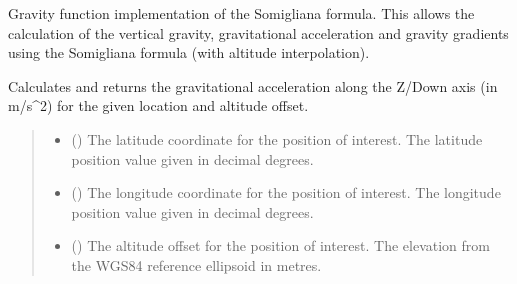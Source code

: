 \documentclass[letterpaper,10pt,english]{sphinxmanual}
\begin{document}
\begin{fulllineitems}
\label{\detokenize{modules/gravity/somigliana:qnav.gravity.somigliana.Somigliana}}
\pysigstartsignatures
{}
\pysigstopsignatures
\sphinxAtStartPar
Gravity function implementation of the Somigliana formula.
This allows the calculation of the vertical gravity, gravitational
acceleration and gravity gradients using the Somigliana formula
(with altitude interpolation).

\begin{fulllineitems}
\label{\detokenize{modules/gravity/somigliana:qnav.gravity.somigliana.Somigliana.calc_gravity_z}}
\pysigstartsignatures
{}
\pysigstopsignatures
\sphinxAtStartPar
Calculates and returns the gravitational acceleration along the Z/Down
axis (in m/s\textasciicircum{}2) for the given location and altitude offset.
\begin{quote}\begin{description}
\begin{itemize}
\item {} 
\sphinxAtStartPar
{} () \textendash{} The latitude coordinate for the position of interest.
The latitude position value given in decimal degrees.

\item {} 
\sphinxAtStartPar
{} () \textendash{} The longitude coordinate for the position of interest.
The longitude position value given in decimal degrees.

\item {} 
\sphinxAtStartPar
{} () \textendash{} The altitude offset for the position of interest.
The elevation from the WGS\sphinxhyphen{}84 reference ellipsoid in metres.


\end{itemize}
\end{description}
\end{quote}
\end{fulllineitems}
\end{fulllineitems}
\end{document}
